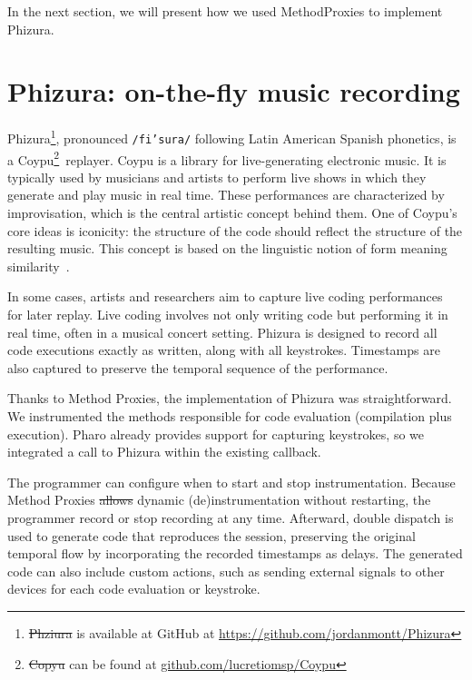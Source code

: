 \documentclass[
]{ceurart}
\providecommand{\DIFadd}[1]{{\protect\color{blue}\uwave{#1}}} %
\providecommand{\DIFdel}[1]{{\protect\color{red}\sout{#1}}} %
\providecommand{\DIFaddbegin}{} %
\providecommand{\DIFaddend}{} %
\providecommand{\DIFdelbegin}{} %
\providecommand{\DIFdelend}{} %
\newcommand{\DIFscaledelfig}{0.5}
\newlength{\DIFdelgraphicswidth} %
\newlength{\DIFdelgraphicsheight} %
\newcommand{\DIFaddincludegraphics}[2][]{{\color{blue}\fbox{\DIFOincludegraphics[#1]{#2}}}} %
\newcommand{\DIFdelincludegraphics}[2][]{%
\sbox{\DIFdelgraphicsbox}{\DIFOincludegraphics[#1]{#2}}%
\settoboxwidth{\DIFdelgraphicswidth}{\DIFdelgraphicsbox} %
\settoboxtotalheight{\DIFdelgraphicsheight}{\DIFdelgraphicsbox} %
\scalebox{\DIFscaledelfig}{%
\parbox[b]{\DIFdelgraphicswidth}{\usebox{\DIFdelgraphicsbox}\\[-\baselineskip] \rule{\DIFdelgraphicswidth}{0em}}\llap{\resizebox{\DIFdelgraphicswidth}{\DIFdelgraphicsheight}{%
\setlength{\unitlength}{\DIFdelgraphicswidth}%
\begin{picture}(1,1)%
\thicklines\linethickness{2pt} %
{\color[rgb]{1,0,0}\put(0,0){\framebox(1,1){}}}%
{\color[rgb]{1,0,0}\put(0,0){\line( 1,1){1}}}%
{\color[rgb]{1,0,0}\put(0,1){\line(1,-1){1}}}%
\end{picture}%
}\hspace*{3pt}}} %
} %
\DeclareRobustCommand{\DIFaddbegin}{\DIFOaddbegin \let\includegraphics\DIFaddincludegraphics} %
\DeclareRobustCommand{\DIFaddend}{\DIFOaddend \let\includegraphics\DIFOincludegraphics} %
\DeclareRobustCommand{\DIFdelbegin}{\DIFOdelbegin \let\includegraphics\DIFdelincludegraphics} %
\DeclareRobustCommand{\DIFdelend}{\DIFOaddend \let\includegraphics\DIFOincludegraphics} %
\begin{document}
In the next section, we will present how we used MethodProxies to implement Phizura.

\section{Phizura: on-the-fly music recording}

Phizura\footnote{\DIFdelbegin \DIFdel{Phziura }\DIFdelend \DIFaddbegin \DIFadd{Phizura }\DIFaddend is available at GitHub at \url{https://github.com/jordanmontt/Phizura}}, pronounced \texttt{/fi'su\*ra/} following Latin American Spanish phonetics, is a Coypu\footnote{\DIFdelbegin \DIFdel{Copyu }\DIFdelend \DIFaddbegin \DIFadd{Coypu }\DIFaddend can be found at \url{github.com/lucretiomsp/Coypu}}\ replayer.
Coypu is a library for live-generating electronic music.
It is typically used by musicians and artists to perform live shows in which they generate and play music in real time.
These performances are characterized by improvisation, which is the central artistic concept behind them.
One of Coypu's core ideas is iconicity: the structure of the code should reflect the structure of the resulting music.
This concept is based on the linguistic notion of form meaning similarity~\cite{Haim85a, Comr81a}.

In some cases, artists and researchers aim to capture live coding performances~\cite{Nils07a} for later replay.
Live coding involves not only writing code but performing it in real time, often in a musical concert setting.
Phizura is designed to record all code executions exactly as written, along with all keystrokes.
Timestamps are also captured to preserve the temporal sequence of the performance.

Thanks to Method Proxies, the implementation of Phizura was straightforward. 
We instrumented the methods responsible for code evaluation (compilation plus execution). 
Pharo already provides support for capturing keystrokes, so we integrated a call to Phizura within the existing callback. 

The programmer can configure when to start and stop instrumentation. 
Because Method Proxies \DIFdelbegin \DIFdel{allows }\DIFdelend \DIFaddbegin \DIFadd{allow }\DIFaddend dynamic (de)instrumentation without restarting, the programmer \DIFaddbegin \DIFadd{can }\DIFaddend record or stop recording at any time.
Afterward, double dispatch is used to generate code that reproduces the session, preserving the original temporal flow by incorporating the recorded timestamps as delays.
The generated code can also include custom actions, such as sending external signals to other devices for each code evaluation or keystroke.
\end{document}
